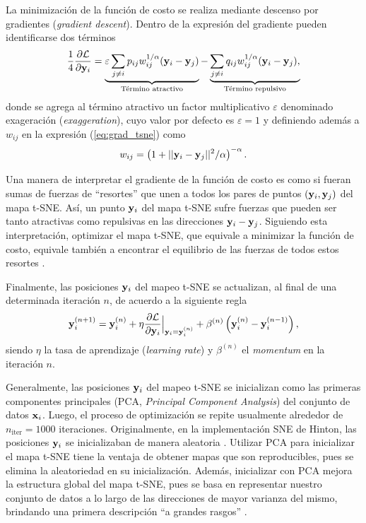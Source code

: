 La minimización de la función de costo se realiza mediante descenso por gradientes (\textit{gradient descent}). Dentro de la expresión del gradiente pueden identificarse dos términos
\begin{equation}
    \frac{1}{4}\frac{\partial\mathcal{L}}{\partial\vb{y}_i} = \underbrace{\varepsilon \sum_{j \neq i} p_{ij}  w_{ij}^{1/\alpha} \qty(\vb{y}_i - \vb{y}_j)}_{\substack{\text{Término atractivo}}} - \underbrace{\sum_{j \neq i} q_{ij}  w_{ij}^{1/\alpha} \qty(\vb{y}_i - \vb{y}_j),}_{\substack{\text{Término repulsivo}}}
    \label{eq:grad_tsne}
\end{equation}
donde se agrega al término atractivo un factor multiplicativo $\varepsilon$ denominado exageración (\textit{exaggeration}), cuyo valor por defecto es $\varepsilon = 1$ \cite{linderman_tsne} y definiendo además a $w_{ij}$ en la expresión (\ref{eq:grad_tsne}) como
\begin{equation}
    w_{ij} = \left( 1+||\vb{y}_i-\vb{y}_j||^2/\alpha \right)^{-\alpha}.
\end{equation}

Una manera de interpretar el gradiente de la función de costo es como si fueran sumas de fuerzas de ``resortes'' que unen a todos los pares de puntos $(\vb{y}_i, \vb{y}_j)$ del mapa t-SNE. Así, un punto $\vb{y}_i$ del mapa t-SNE sufre fuerzas que pueden ser tanto atractivas como repulsivas en las direcciones $\vb{y}_i - \vb{y}_j$. Siguiendo esta interpretación, optimizar el mapa t-SNE, que equivale a minimizar la función de costo, equivale también a encontrar el equilibrio de las fuerzas de todos estos resortes \cite{cook_unisne}.

Finalmente, las posiciones {$\vb{y}_i$} del mapeo t-SNE se actualizan, al final de una determinada iteración $n$, de acuerdo a la siguiente regla \cite{vdm_tsne, yang_ssne}
\begin{equation}
    \vb{y}_i^{(n+1)} = \vb{y}_i^{(n)} + \eta \frac{\partial\mathcal{L}}{\partial\vb{y}_{i}}\Big|_{\vb{y}_{i} = \vb{y}_{i}^{(n)}} + \beta^{(n)} \left( \vb{y}_{i}^{(n)} - \vb{y}_{i}^{(n-1)} \right),
\end{equation}
siendo $\eta$ la tasa de aprendizaje (\textit{learning rate}) y $\beta^{(n)}$ el \textit{momentum} en la iteración $n$.

Generalmente, las posiciones {$\vb{y}_i$} del mapeo t-SNE se inicializan como las primeras componentes principales (PCA, \textit{Principal Component Analysis}) del conjunto de datos {$\vb{x}_i$}. Luego, el proceso de optimización se repite usualmente alrededor de $n_{\mathrm{iter}} = 1000$ iteraciones. Originalmente, en la implementación SNE de Hinton, las posiciones {$\vb{y}_i$} se inicializaban de manera aleatoria \cite{hinton_sne}. Utilizar PCA para inicializar el mapa t-SNE tiene la ventaja de obtener mapas que son reproducibles, pues se elimina la aleatoriedad en su inicialización. Además, inicializar con PCA mejora la estructura global del mapa t-SNE, pues se basa en representar nuestro conjunto de datos a lo largo de las direcciones de mayor varianza del mismo, brindando una primera descripción ``a grandes rasgos'' \cite{kobak_art}.

